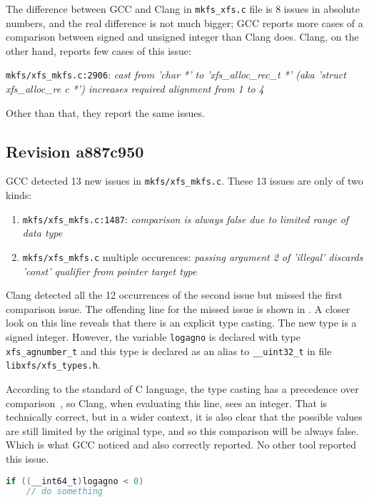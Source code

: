 The difference between GCC and Clang in {\tt mkfs\_xfs.c} file is 8 issues in
absolute numbers, and the real difference is not much bigger; GCC reports more
cases of a comparison between signed and unsigned integer than Clang does.
Clang, on the other hand, reports few cases of this issue:

{\tt mkfs/xfs\_mkfs.c:2906}: {\em cast from 'char *' to 'xfs\_alloc\_rec\_t *' (aka
'struct xfs\_alloc\_re    c *') increases required alignment from 1 to 4}

Other than that, they report the same issues.

\subsection{Revision a887c950}\label{chap:results:gcc:a887c950}
GCC detected 13 new issues in {\tt mkfs/xfs\_mkfs.c}. These 13 issues are only of two
kinds:
\begin{enumerate}
	\item {\tt mkfs/xfs\_mkfs.c:1487}: {\em comparison is always false due
		to limited range of data type}
	\item {\tt mkfs/xfs\_mkfs.c} multiple occurences: {\em passing
		argument 2 of 'illegal' discards 'const' qualifier from
		pointer target type}
\end{enumerate}

Clang detected all the 12 occurrences of the second issue but missed the first
comparison issue. The offending line for the missed issue is shown in
. A closer look on this line reveals that
there is an explicit type casting. The new type is a signed integer. However,
the variable {\tt logagno} is declared with type {\tt xfs\_agnumber\_t} and
this type is declared as an alias to {\tt \_\_uint32\_t} in file {\tt
libxfs/xfs\_types.h}.

According to the standard of C language, the type casting has a precedence over
comparison~\cite[A.2.1]{ISO9899}, so Clang, when evaluating this line, sees
an integer. That is technically correct, but in a wider context, it is also
clear that the possible values are still limited by the original type, and
so this comparison will be always false.  Which is what GCC noticed and
also correctly reported. No other tool reported this issue.


\begin{lstlisting}[frame=none, basicstyle=\footnotesize\ttfamily,
language=C, numbers=none, numberstyle=\tiny\color{black},caption=
{Line on which GCC found the comparison issue.},
label={lst:results:logagnoComparison}]
if ((__int64_t)logagno < 0)
	// do something
\end{lstlisting}

